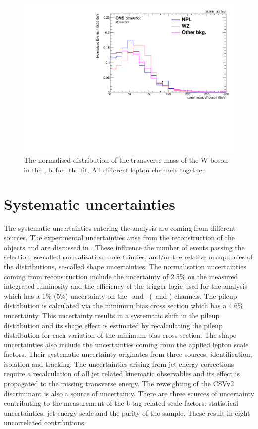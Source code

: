 \begin{figure}[htbp]
	\centering
	\includegraphics[width=0.49\linewidth]{6_Search/Figures/MTWnormalised/MTW_all_Normalized}
	\caption{The normalised distribution of the transverse mass of the W boson in the \WZCR, before the fit. All different lepton channels together. }
	\label{fig:mtwallnorm}
\end{figure}

\newpage
\section{Systematic uncertainties}
\label{sec:sys}
The systematic uncertainties entering the analysis are coming from different sources. The experimental uncertainties arise from the reconstruction of the objects and are discussed in . These influence the number of events passing the selection, so-called normalisation uncertainties, and/or the relative occupancies of the distributions, so-called shape
 uncertainties. The normalisation uncertainties coming from reconstruction include the uncertainty of 2.5\% on the measured integrated luminosity and the efficiency of the trigger logic used for the analysis which has a 1\% (5\%) uncertainty on the 
 \mumumu\ and \emumu\ (\eemu\ and \eee) channels. The  pileup distribution is calculated via the minimum bias cross section which has a 4.6\% uncertainty. This uncertainty results in a systematic shift in the pileup distribution and its shape effect is estimated by recalculating the pileup distribution for each variation of the minimum bias cross section. The shape uncertainties also include the uncertainties coming from the applied lepton scale factors. Their systematic uncertainty originates from three sources: identification, isolation and tracking.  The uncertainties arising from jet energy corrections require a recalculation of all jet related kinematic observables and its effect is propagated to the missing transverse energy.  The reweighting of the CSVv2 discriminant is also a source of uncertainty. There are three sources of uncertainty contributing to the measurement of the b-tag related scale factors: statistical uncertainties, jet energy scale and the purity of the sample. These result in eight uncorrelated contributions. 
 
